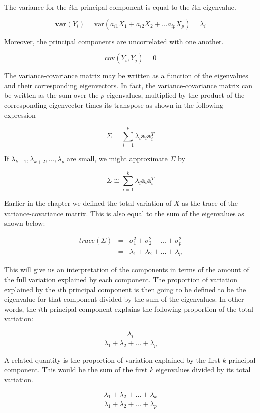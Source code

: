 \documentclass[]{book}
\begin{document}
The variance for the \(i\)th principal component is equal to the \(i\)th
eigenvalue.

\[ \textbf{var}(Y_i) = \text{var}(a_{i1}X_1 + a_{i2}X_2 + \dots a_{ip}X_p) = \lambda_i \]

Moreover, the principal components are uncorrelated with one another.

\[\text{cov}(Y_i, Y_j) = 0\]

The variance-covariance matrix may be written as a function of the
eigenvalues and their corresponding eigenvectors. In fact, the
variance-covariance matrix can be written as the sum over the \(p\)
eigenvalues, multiplied by the product of the corresponding eigenvector
times its transpose as shown in the following expression

\[ \Sigma  =  \sum_{i=1}^{p}\lambda_i \mathbf{a}_i \mathbf{a}_i^T \]

If \(\lambda_{k+1}, \lambda_{k+2}, \dots , \lambda_{p}\) are small, we
might approximate \(\Sigma\) by

\[ \Sigma  \cong  \sum_{i=1}^{k}\lambda_i \mathbf{a}_i\mathbf{a}_i^T \]

Earlier in the chapter we defined the total variation of \(X\) as the
trace of the variance-covariance matrix. This is also equal to the sum
of the eigenvalues as shown below:

\[ \begin{array}{lll}trace(\Sigma) & = & \sigma^2_1 + \sigma^2_2 + \dots +\sigma^2_p \\ & = & \lambda_1 + \lambda_2 + \dots + \lambda_p\end{array} \]

This will give us an interpretation of the components in terms of the
amount of the full variation explained by each component. The proportion
of variation explained by the \(i\)th principal component is then going
to be defined to be the eigenvalue for that component divided by the sum
of the eigenvalues. In other words, the \(i\)th principal component
explains the following proportion of the total variation:

\[ \frac{\lambda_i}{\lambda_1 + \lambda_2 + \dots + \lambda_p} \]

A related quantity is the proportion of variation explained by the first
\(k\) principal component. This would be the sum of the first \(k\)
eigenvalues divided by its total variation.

\[ \frac{\lambda_1 + \lambda_2 + \dots + \lambda_k}{\lambda_1 + \lambda_2 + \dots + \lambda_p} \]
\end{document}
